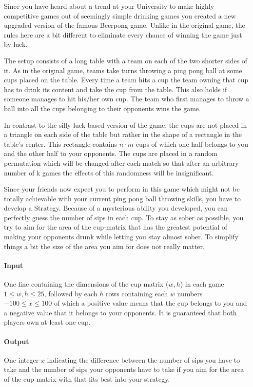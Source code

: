 



\makeheader

Since you have heard about a trend at your University to make highly competitive games out of seemingly simple drinking games you created a new upgraded version of the famous Beerpong game. Unlike in the original game, the rules here are a bit different to eliminate every chance of winning the game just by luck. 

The setup consists of a long table with a team on each of the two shorter sides of it. As in the original game, teams take turns throwing a ping pong ball at some cups placed on the table. Every time a team hits a cup the team owning that cup has to drink its content and take the cup from the table. This also holds if someone manages to hit his/her own cup. The team who first manages to throw a ball into all the cups belonging to their opponents wins the game. 

In contrast to the silly luck-based version of the game, the cups are not placed in a triangle on each side of the table but rather in the shape of a rectangle in the table's center. This rectangle contains  $n \cdot m$ cups of which one half belongs to you and the other half to your opponents. The cups are placed in a random permutation which will be changed after each match so that after an arbitrary number of k games the effects of this randomness will be insignificant. 

Since your friends now expect you to perform in this game which might not be totally achievable with your current ping pong ball throwing skills, you have to develop a Strategy. Because of a mysterious ability you developed, you can perfectly guess the number of sips in each cup. To stay as sober as possible, you try to aim for the area of the cup-matrix that has the greatest potential of making your opponents drunk while letting you stay almost sober. To simplify things a bit the size of the area you aim for does not really matter.


\paragraph*{Input}
One line containing the dimensions of the cup matrix ($w,h$) in each game $1 \leq w,h \leq 25$, followed by each $h$ rows containing each $w$ numbers $-100 \leq x \leq 100$ of which a positive value means that the cup belongs to you and a negative value that it belongs to your opponents.
It is guaranteed that both players own at least one cup.

\paragraph*{Output}
One integer $x$ indicating the difference between the number of sips you have to take and the number of sips your opponents have to take if you aim for the area of the cup matrix with that fits best into your strategy.

\begin{samples}
\end{samples}


